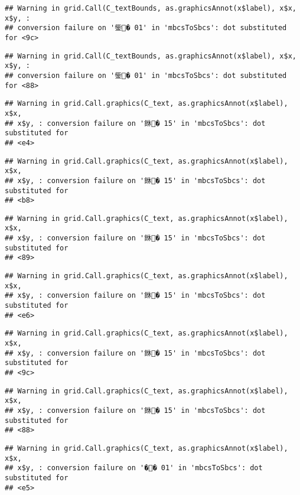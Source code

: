 \documentclass[]{article}
\begin{document}
\begin{verbatim}
## Warning in grid.Call(C_textBounds, as.graphicsAnnot(x$label), x$x, x$y, :
## conversion failure on '鈭� 01' in 'mbcsToSbcs': dot substituted for <9c>
\end{verbatim}

\begin{verbatim}
## Warning in grid.Call(C_textBounds, as.graphicsAnnot(x$label), x$x, x$y, :
## conversion failure on '鈭� 01' in 'mbcsToSbcs': dot substituted for <88>
\end{verbatim}

\begin{verbatim}
## Warning in grid.Call.graphics(C_text, as.graphicsAnnot(x$label), x$x,
## x$y, : conversion failure on '銝� 15' in 'mbcsToSbcs': dot substituted for
## <e4>
\end{verbatim}

\begin{verbatim}
## Warning in grid.Call.graphics(C_text, as.graphicsAnnot(x$label), x$x,
## x$y, : conversion failure on '銝� 15' in 'mbcsToSbcs': dot substituted for
## <b8>
\end{verbatim}

\begin{verbatim}
## Warning in grid.Call.graphics(C_text, as.graphicsAnnot(x$label), x$x,
## x$y, : conversion failure on '銝� 15' in 'mbcsToSbcs': dot substituted for
## <89>
\end{verbatim}

\begin{verbatim}
## Warning in grid.Call.graphics(C_text, as.graphicsAnnot(x$label), x$x,
## x$y, : conversion failure on '銝� 15' in 'mbcsToSbcs': dot substituted for
## <e6>
\end{verbatim}

\begin{verbatim}
## Warning in grid.Call.graphics(C_text, as.graphicsAnnot(x$label), x$x,
## x$y, : conversion failure on '銝� 15' in 'mbcsToSbcs': dot substituted for
## <9c>
\end{verbatim}

\begin{verbatim}
## Warning in grid.Call.graphics(C_text, as.graphicsAnnot(x$label), x$x,
## x$y, : conversion failure on '銝� 15' in 'mbcsToSbcs': dot substituted for
## <88>
\end{verbatim}

\begin{verbatim}
## Warning in grid.Call.graphics(C_text, as.graphicsAnnot(x$label), x$x,
## x$y, : conversion failure on '�� 01' in 'mbcsToSbcs': dot substituted for
## <e5>
\end{verbatim}
\end{document}

